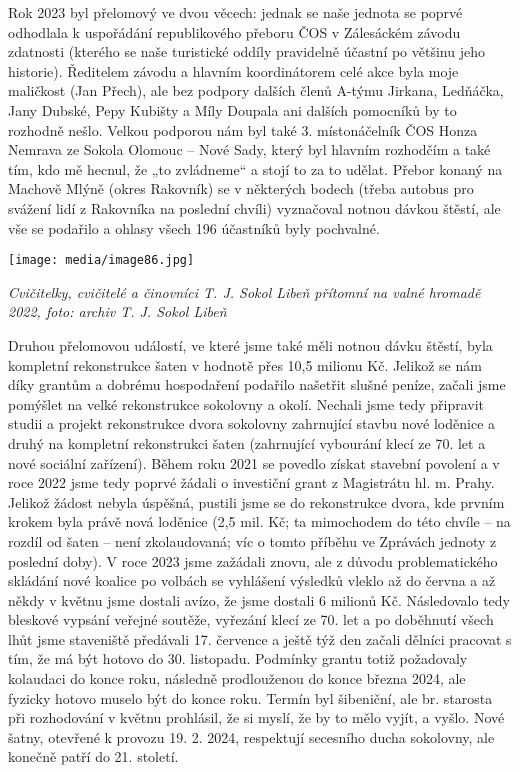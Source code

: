 Rok 2023 byl přelomový ve dvou věcech: jednak se naše jednota se poprvé
odhodlala k uspořádání republikového přeboru ČOS v Zálesáckém závodu
zdatnosti (kterého se naše turistické oddíly pravidelně účastní po
většinu jeho historie). Ředitelem závodu a hlavním koordinátorem celé
akce byla moje maličkost (Jan Přech), ale bez podpory dalších členů
A-týmu Jirkana, Ledňáčka, Jany Dubské, Pepy Kubišty a Míly Doupala ani
dalších pomocníků by to rozhodně nešlo. Velkou podporou nám byl také 3.
místonáčelník ČOS Honza Nemrava ze Sokola Olomouc -- Nové Sady, který
byl hlavním rozhodčím a také tím, kdo mě hecnul, že „to zvládneme`` a
stojí to za to udělat. Přebor konaný na Machově Mlýně (okres Rakovník)
se v některých bodech (třeba autobus pro svážení lidí z Rakovníka na
poslední chvíli) vyznačoval notnou dávkou štěstí, ale vše se podařilo a
ohlasy všech 196 účastníků byly pochvalné.

\texttt{[image: media/image86.jpg]}

\emph{Cvičitelky, cvičitelé a činovníci T. J. Sokol Libeň přítomní na
valné hromadě 2022, foto: archiv T. J. Sokol Libeň}

Druhou přelomovou událostí, ve které jsme také měli notnou dávku štěstí,
byla kompletní rekonstrukce šaten v hodnotě přes 10,5 milionu Kč.
Jelikož se nám díky grantům a dobrému hospodaření podařilo našetřit
slušné peníze, začali jsme pomýšlet na velké rekonstrukce sokolovny a
okolí. Nechali jsme tedy připravit studii a projekt rekonstrukce dvora
sokolovny zahrnující stavbu nové loděnice a druhý na kompletní
rekonstrukci šaten (zahrnující vybourání klecí ze 70. let a nové
sociální zařízení). Během roku 2021 se povedlo získat stavební povolení
a v roce 2022 jsme tedy poprvé žádali o investiční grant z Magistrátu
hl. m. Prahy. Jelikož žádost nebyla úspěšná, pustili jsme se do
rekonstrukce dvora, kde prvním krokem byla právě nová loděnice (2,5 mil.
Kč; ta mimochodem do této chvíle -- na rozdíl od šaten -- není
zkolaudovaná; víc o tomto příběhu ve Zprávách jednoty z poslední doby).
V roce 2023 jsme zažádali znovu, ale z důvodu problematického skládání
nové koalice po volbách se vyhlášení výsledků vleklo až do června a až
někdy v květnu jsme dostali avízo, že jsme dostali 6 milionů Kč.
Následovalo tedy bleskové vypsání veřejné soutěže, vyřezání klecí ze 70.
let a po doběhnutí všech lhůt jsme staveniště předávali 17. července a
ještě týž den začali dělníci pracovat s tím, že má být hotovo do 30.
listopadu. Podmínky grantu totiž požadovaly kolaudaci do konce roku,
následně prodlouženou do konce března 2024, ale fyzicky hotovo muselo
být do konce roku. Termín byl šibeniční, ale br. starosta při
rozhodování v květnu prohlásil, že si myslí, že by to mělo vyjít, a
vyšlo. Nové šatny, otevřené k provozu 19. 2. 2024, respektují secesního
ducha sokolovny, ale konečně patří do 21. století.

